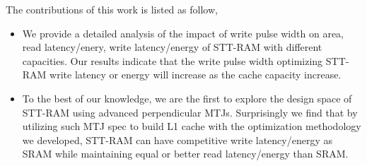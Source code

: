 The contributions of this work is listed as follow, 
\begin{itemize}
\item We provide a detailed analysis of the impact of write pulse width on area, read latency/enery, write latency/energy of STT-RAM with different capacities. Our results indicate that the write pulse width optimizing STT-RAM write latency or energy will increase as the cache capacity increase.
\item To the best of our knowledge, we are the first to explore the design space of STT-RAM using advanced perpendicular MTJs. Surprisingly we find that by utilizing such MTJ spec to build L1 cache with the optimization methodology we developed, STT-RAM can have competitive write latency/energy as SRAM while maintaining equal or better read latency/energy than SRAM. 
\end{itemize}